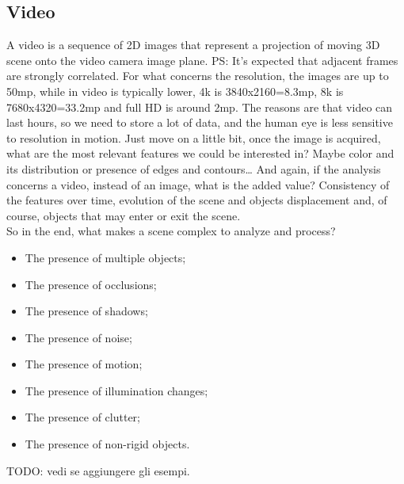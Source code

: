 \subsection{Video}
A video is a sequence of 2D images that represent a projection of moving 3D scene onto the video camera image plane. PS: It's expected that adjacent frames are strongly correlated.
For what concerns the resolution, the images are up to 50mp, while in video is typically lower, 4k is 3840x2160=8.3mp, 8k is 7680x4320=33.2mp and full HD is around 2mp.
The reasons are that video can last hours, so we need to store a lot of data, and the human eye is less sensitive to resolution in motion. 
Just move on a little bit, once the image is acquired, what are the most relevant features we could be interested in? Maybe color and its distribution or presence of edges and contours\dots
And again, if the analysis concerns a video, instead of an image, what is the added value?
Consistency of the features over time, evolution of the scene and objects displacement and, of course, objects that may enter or exit the scene.
\\So in the end, what makes a scene complex to analyze and process?
\begin{itemize}
    \item The presence of multiple objects;
    \item The presence of occlusions;
    \item The presence of shadows;
    \item The presence of noise;
    \item The presence of motion;
    \item The presence of illumination changes;
    \item The presence of clutter;
    \item The presence of non-rigid objects.
\end{itemize}
    TODO: vedi se aggiungere gli esempi.

